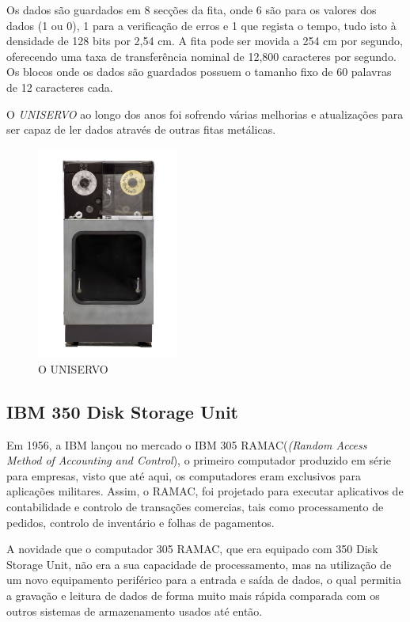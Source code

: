 \documentclass{report}
\begin{document}
	Os dados são guardados em 8 secções da fita, onde 6 são para os valores dos dados (1 ou 0), 1 para a verificação de erros e 1 que regista o tempo, tudo isto à densidade de 128 bits por 2,54 cm. A fita pode ser movida a 254 cm por segundo, oferecendo uma taxa de transferência nominal de 12,800 caracteres por segundo. Os blocos onde os dados são guardados possuem o tamanho fixo de 60 palavras de 12 caracteres cada.
\vspace{1mm}
	
	O \textit{UNISERVO}  ao longo dos anos foi sofrendo várias melhorias e atualizações para ser capaz de ler dados através de outras fitas metálicas.
\vspace{1mm}

\begin{figure}[h]
		\centering
		\includegraphics[width=4.7cm, height=7cm]{uniservo.jpg}
		\caption{O UNISERVO}
		\end{figure}
	

		\subsection{IBM 350 Disk Storage Unit}
		
		Em 1956, a IBM lançou no mercado o IBM 305 RAMAC(\textit{(Random Access Method of Accounting and Control}), o primeiro computador produzido em série para empresas, visto que até aqui, os computadores eram exclusivos para aplicações militares. Assim, o RAMAC, foi projetado para executar aplicativos de contabilidade e controlo de transações comercias, tais como processamento de pedidos, controlo de inventário e folhas de pagamentos.
\vspace{1mm}
		
		A novidade que o computador 305 RAMAC, que era equipado com 350 Disk Storage Unit, não era a sua capacidade de processamento, mas na utilização de um novo equipamento periférico para a entrada e saída de dados, o qual permitia a gravação e leitura de dados de forma muito mais rápida comparada com os outros sistemas de armazenamento usados até então.
		
\end{document}
